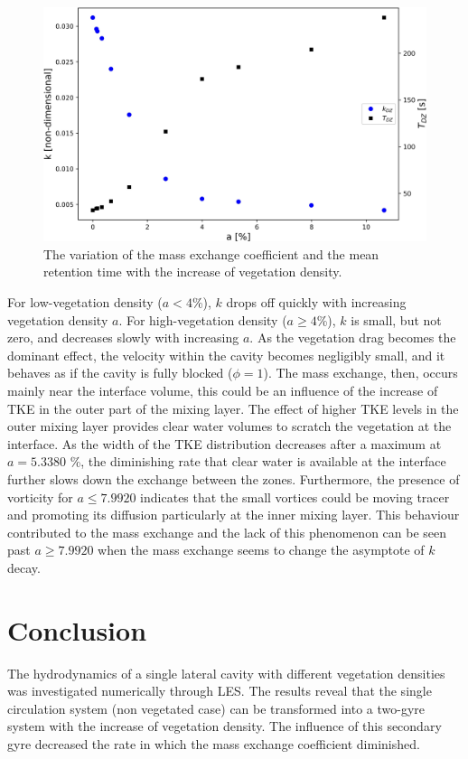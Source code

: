 \begin{figure}[!ht]
\centering
\includegraphics[width=\linewidth]{../images/art4/massExchange.jpg}
\caption{The variation of the mass exchange coefficient and the mean retention time with the increase of vegetation density.}
\label{fig:art4:massExchange}
\end{figure}

For low-vegetation density ($a < 4$\%), $k$ drops off quickly with increasing vegetation density $a$. For high-vegetation density ($a \geq 4$\%), $k$ is small, but not zero, and decreases slowly with increasing $a$. As the vegetation drag becomes the dominant effect, the velocity within the cavity becomes negligibly small, and it behaves as if the cavity is fully blocked ($\phi = 1$). The mass exchange, then, occurs mainly near the interface volume, this could be an influence of the increase of TKE in the outer part of the mixing layer. The effect of higher TKE levels in the outer mixing layer provides clear water volumes to scratch the vegetation at the interface. As the width of the TKE distribution decreases after a maximum at $a = 5.3380$ \%, the diminishing rate that clear water is available at the interface further slows down the exchange between the zones. Furthermore, the presence of vorticity for $a \leq 7.9920$ indicates that the small vortices could be moving tracer and promoting its diffusion particularly at the inner mixing layer. This behaviour contributed to the mass exchange and the lack of this phenomenon can be seen past $a \geq 7.9920$ when the mass exchange seems to change the asymptote of $k$ decay.

\section{Conclusion}
The hydrodynamics of a single lateral cavity with different vegetation densities was investigated numerically through LES. The results reveal that the single circulation system (non vegetated case) can be transformed into a two-gyre system with the increase of vegetation density. The influence of this secondary gyre decreased the rate in which the mass exchange coefficient diminished.


